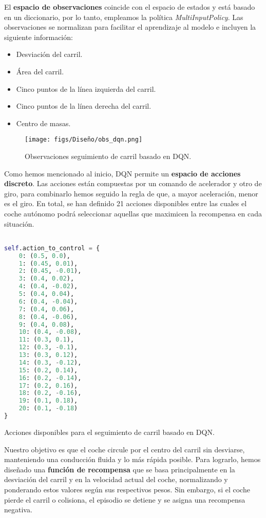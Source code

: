El \textbf{espacio de observaciones} coincide con el espacio de estados y está basado en un diccionario, por lo tanto, empleamos la política \textit{MultiInputPolicy}. Las observaciones se normalizan para facilitar el aprendizaje al modelo e incluyen la siguiente información: 
\begin{itemize}
		\item Desviación del carril.
		\item Área del carril.
		\item Cinco puntos de la línea izquierda del carril.
		\item Cinco puntos de la línea derecha del carril.
		\item Centro de masas.
\end{itemize}

\begin{figure}[ht]
  \centering
  \texttt{[image: figs/Diseño/obs\_dqn.png]}
  \caption{Observaciones seguimiento de carril basado en \ac{DQN}.}
  \label{fig:dqn_obs}
\end{figure}

Como hemos mencionado al inicio, \ac{DQN} permite un \textbf{espacio de acciones discreto}. Las acciones están compuestas por un comando de acelerador y otro de giro, para combinarlo hemos seguido la regla de que, a mayor aceleración, menor es el giro. En total, se han definido 21 acciones disponibles entre las cuales el coche autónomo podrá seleccionar aquellas que maximicen la recompensa en cada situación.

\begin{code}[h]
\begin{lstlisting}[language=Python]

self.action_to_control = {
    0: (0.5, 0.0),
    1: (0.45, 0.01), 
    2: (0.45, -0.01),
    3: (0.4, 0.02),
    4: (0.4, -0.02),
    5: (0.4, 0.04),
    6: (0.4, -0.04),
    7: (0.4, 0.06),
    8: (0.4, -0.06),
    9: (0.4, 0.08),
    10: (0.4, -0.08),
    11: (0.3, 0.1),
    12: (0.3, -0.1),
    13: (0.3, 0.12),
    14: (0.3, -0.12),
    15: (0.2, 0.14),
    16: (0.2, -0.14),
    17: (0.2, 0.16),
    18: (0.2, -0.16),
    19: (0.1, 0.18),
    20: (0.1, -0.18)
}

\end{lstlisting}
\caption[Acciones disponibles para el seguimiento de carril basado en \ac{DQN}]{Acciones disponibles para el seguimiento de carril basado en \ac{DQN}.}
\label{cod:acc_dqn}
\end{code}

Nuestro objetivo es que el coche circule por el centro del carril sin desviarse, manteniendo una conducción fluida y lo más rápida posible. Para lograrlo, hemos diseñado una \textbf{función de recompensa} que se basa principalmente en la desviación del carril y en la velocidad actual del coche, normalizando y ponderando estos valores según sus respectivos pesos. Sin embargo, si el coche pierde el carril o colisiona, el episodio se detiene y se asigna una recompensa negativa.

